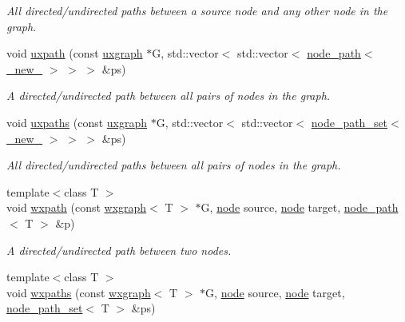 \begin{DoxyCompactItemize}
\begin{DoxyCompactList}\small\item\em All directed/undirected paths between a source node and any other node in the graph. \end{DoxyCompactList}\item 
void \hyperlink{namespacelgraph_1_1traversal_a84e2456a95f432086b4179342bbf7a0f}{uxpath} (const \hyperlink{classlgraph_1_1uxgraph}{uxgraph} $\ast$G, std\+::vector$<$ std\+::vector$<$ \hyperlink{classlgraph_1_1node__path}{node\+\_\+path}$<$ \hyperlink{namespacelgraph_aa930092705699c3af78e3a4de7880a3f}{\+\_\+new\+\_\+} $>$ $>$ $>$ \&ps)
\begin{DoxyCompactList}\small\item\em A directed/undirected path between all pairs of nodes in the graph. \end{DoxyCompactList}\item 
void \hyperlink{namespacelgraph_1_1traversal_a26efdc24fea2108a7c1a4a138356b236}{uxpaths} (const \hyperlink{classlgraph_1_1uxgraph}{uxgraph} $\ast$G, std\+::vector$<$ std\+::vector$<$ \hyperlink{namespacelgraph_a0570ce57129123d5816913d287f6cc73}{node\+\_\+path\+\_\+set}$<$ \hyperlink{namespacelgraph_aa930092705699c3af78e3a4de7880a3f}{\+\_\+new\+\_\+} $>$ $>$ $>$ \&ps)
\begin{DoxyCompactList}\small\item\em All directed/undirected paths between all pairs of nodes in the graph. \end{DoxyCompactList}\item 
{\footnotesize template$<$class T $>$ }\\void \hyperlink{namespacelgraph_1_1traversal_acb255be04a53f1d3863f7beaeda2dde0}{wxpath} (const \hyperlink{classlgraph_1_1wxgraph}{wxgraph}$<$ T $>$ $\ast$G, \hyperlink{namespacelgraph_a397169dd66adf725210a30fb7251773e}{node} source, \hyperlink{namespacelgraph_a397169dd66adf725210a30fb7251773e}{node} target, \hyperlink{classlgraph_1_1node__path}{node\+\_\+path}$<$ T $>$ \&p)
\begin{DoxyCompactList}\small\item\em A directed/undirected path between two nodes. \end{DoxyCompactList}\item 
{\footnotesize template$<$class T $>$ }\\void \hyperlink{namespacelgraph_1_1traversal_a97b92a041fa93b26f26d60d11f717dc5}{wxpaths} (const \hyperlink{classlgraph_1_1wxgraph}{wxgraph}$<$ T $>$ $\ast$G, \hyperlink{namespacelgraph_a397169dd66adf725210a30fb7251773e}{node} source, \hyperlink{namespacelgraph_a397169dd66adf725210a30fb7251773e}{node} target, \hyperlink{namespacelgraph_a0570ce57129123d5816913d287f6cc73}{node\+\_\+path\+\_\+set}$<$ T $>$ \&ps)

\end{DoxyCompactItemize}

